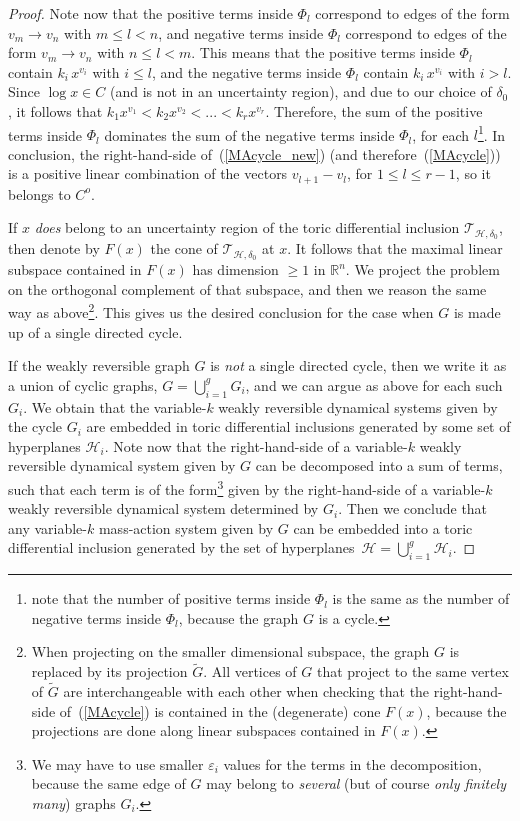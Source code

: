\documentclass[12pt,letterpaper]{article}
\newcommand{\T}{\mathcal{T}}
\renewcommand{\H}{\mathcal{H}}
\newcommand{\RR}{\mathbb{R}}
\newcommand{\eps}{\varepsilon}
\begin{document}
\begin{proof}
Note now that the positive terms inside $\Phi_l$ correspond to edges of the form $v_{m} \to v_{n}$ with $m \le l < n$, and negative terms inside $\Phi_l$ correspond to edges of the form $v_{m} \to v_{n}$ with $n \le l < m$. This means that the positive terms inside $\Phi_l$ contain $k_i \, x^{v_i}$ with $i \le l$, and the negative terms inside $\Phi_l$ contain $k_i \, x^{v_i}$ with $i > l$. Since $\log x \in C$  (and is not in an uncertainty region), and due to our choice of $\delta_0$, it follows that $k_1 x^{v_1} < k_2 x^{v_2} < ... < k_r x^{v_r}$. Therefore, the sum of the positive terms inside $\Phi_l$ dominates the sum of the negative terms inside $\Phi_l$, for each $l$\footnote{
note that the number of positive terms inside $\Phi_l$ is the same as the number of negative terms inside $\Phi_l$, because the graph $G$ is a cycle.
}. In conclusion, the right-hand-side of~(\ref{MAcycle_new}) (and therefore~(\ref{MAcycle})) is a positive linear combination of the vectors $v_{l+1} - v_l$, for $1 \le l \le r-1$, so it belongs to $C^o$.


\bigskip

If $x$ {\em does} belong to an uncertainty region of the toric differential inclusion $\T_{\H,\delta_0}$, then denote by $F(x)$ the cone of $\T_{\H,\delta_0}$ at $x$.  It follows that the maximal linear subspace contained in $F(x)$ has dimension $\ge 1$ in $\RR^n$. We project the problem on the orthogonal complement of that subspace, and then we reason the same way as above\footnote{
When projecting on the smaller dimensional subspace, the graph $G$ is replaced by its projection $\tilde G$. All vertices of $G$ that project to the same vertex of $\tilde G$ are interchangeable with each other when checking that the right-hand-side of~(\ref{MAcycle}) is contained in the (degenerate) cone $F(x)$, because the projections are done along linear subspaces contained in $F(x)$.
}. This gives us the desired conclusion for the case when $G$ is made up of a single directed cycle.


\bigskip

If the weakly reversible graph $G$ is {\it not} a single directed cycle, then we write it as a union of cyclic graphs, $\displaystyle G = \bigcup_{i=1}^g G_i$, and we can argue as above for each such $G_i$. We obtain that the variable-$k$  weakly reversible dynamical systems given by the cycle $G_i$ are embedded in toric differential inclusions generated by some set of hyperplanes $\H_i$.
Note now that the right-hand-side of a variable-$k$  weakly reversible dynamical system given by $G$ can be decomposed into a sum of terms, such that each term is of the form\footnote{
We may have to use smaller $\eps_i$ values for the terms in the decomposition, because the same edge of $G$ may belong to {\em several} (but of course {\em only finitely many}) graphs $G_i$.
} given by the right-hand-side of a variable-$k$  weakly reversible dynamical system determined by $G_i$. 
Then we conclude that any variable-$k$  mass-action system given by $G$ can be embedded into a toric differential inclusion generated by the set of hyperplanes~$\displaystyle \H = \bigcup_{i=1}^g \H_i$.
%
\end{proof}
\end{document}
